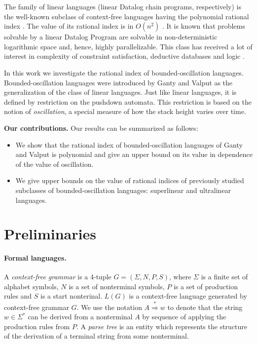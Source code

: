 \documentclass[11pt,a4paper]{article} %
\begin{document}
The family of linear languages (linear Datalog chain programs, respectively) is the well-known subclass of context-free languages having the polynomial rational index \cite{RatBasic, Ullman}. The value of its rational index is in $O(n^2)$ \cite{RatBasic}. It is known that problems solvable by a linear Datalog Program are solvable in non-deterministic logarithmic space and, hence,  highly parallelizable. This class has received a lot of interest in complexity of constraint satisfaction, deductive databases and logic \cite{ linearisability, Dalmau2005LinearDA, linopt, Ullman}. 





In this work we investigate the rational index of  bounded-oscillation languages. Bounded-oscillation languages were introduced by Ganty and Valput \cite{BoundOsc} as the generalization of the class of linear languages. Just like linear languages, it is defined by restriction on the pushdown automata. This restriction is based on the notion of \textit{oscillation}, a special measure of how the stack height varies over time. 


\textbf{Our contributions.} Our results can be summarized as follows:
\begin{itemize}
\item We show that the rational index of bounded-oscillation languages of Ganty and Valput \cite{BoundOsc} is polynomial and give an upper bound on its value in dependence of the value of oscillation.
\item We give upper bounds on the value of rational indices of previously studied subclasses of bounded-oscillation languages: superlinear and ultralinear languages.
\end{itemize}





\section{Preliminaries}
\label{sec:prel}
\label{preliminaries}
\paragraph{Formal languages.} 
A \textit{context-free grammar} is a 4-tuple $G = (\Sigma, N, P, S)$, where $\Sigma$ is a finite set of alphabet symbols,  $N$ is a set of nonterminal symbols, $P$ is a set of production rules and $S$ is a start nonterinal. $L(G)$ is a context-free language generated by context-free grammar $G$. We use the notation $A \stackrel {*}{\Rightarrow } w$  to denote that the string $w \in \Sigma^*$ can be derived from a nonterminal $A$ by sequence of applying the production rules from $P$. A \textit{parse tree} is an entity which represents the structure of the derivation of a terminal string from some nonterminal.
\end{document}
